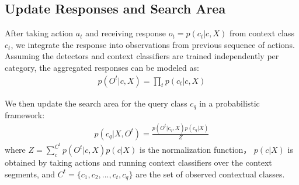 \subsection{Update Responses and Search Area}
After taking action $a_t$ and receiving response $o_t = p(c_t|c, X)$ from context class $c_t$, we integrate the response into observations from previous sequence of actions. Assuming the detectors and context classifiers are trained independently per category, the aggregated responses can be modeled as:
\begin{eqnarray}
p(O^t|c, X) = \prod_t p(c_t|c,X)
\end{eqnarray}

We then update the search area for the query class $c_q$ in a probabilistic framework:
\begin{eqnarray}
p(c_q|X,O^t) = \frac{p(O^t|c_q,X)p(c_q|X)}{Z}
\end{eqnarray}
where $Z = \sum_c^{C^t} p(O^t|c,X)p(c|X)$ is the normalization function， $p(c|X)$ is obtained by taking actions and running context classifiers over the context segments,  and $C^t = \{c_1, c_2, ..., c_t, c_q\}$ are the set of observed contextual classes.
